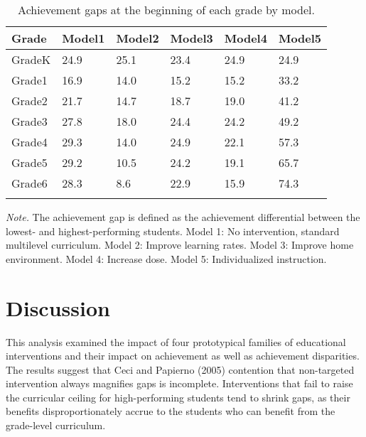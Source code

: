 \documentclass[english,floatsintext,jou]{apa6}
\theoremstyle{definition}
\theoremstyle{definition}
\theoremstyle{definition}
\theoremstyle{remark}
\begin{document}
\begin{table}[tbp]
\begin{center}
\begin{threeparttable}
\caption{\label{tab:ach-gaps}Achievement gaps at the beginning of each grade by model.}
\small{
\begin{tabular}{llllll}
\toprule
Grade & \multicolumn{1}{c}{Model1} & \multicolumn{1}{c}{Model2} & \multicolumn{1}{c}{Model3} & \multicolumn{1}{c}{Model4} & \multicolumn{1}{c}{Model5}\\
\midrule
GradeK & 24.9 & 25.1 & 23.4 & 24.9 & 24.9\\
Grade1 & 16.9 & 14.0 & 15.2 & 15.2 & 33.2\\
Grade2 & 21.7 & 14.7 & 18.7 & 19.0 & 41.2\\
Grade3 & 27.8 & 18.0 & 24.4 & 24.2 & 49.2\\
Grade4 & 29.3 & 14.0 & 24.9 & 22.1 & 57.3\\
Grade5 & 29.2 & 10.5 & 24.2 & 19.1 & 65.7\\
Grade6 & 28.3 & 8.6 & 22.9 & 15.9 & 74.3\\
\bottomrule
\addlinespace
\end{tabular}
}
\begin{tablenotes}[para]
\textit{Note.} The achievement gap is defined as the achievement differential between the lowest- and highest-performing students. Model 1: No intervention, standard multilevel curriculum. Model 2: Improve learning rates. Model 3: Improve home environment. Model 4: Increase dose. Model 5: Individualized instruction.
\end{tablenotes}
\end{threeparttable}
\end{center}
\end{table}

\section{Discussion}\label{discussion}

This analysis examined the impact of four prototypical families of
educational interventions and their impact on achievement as well as
achievement disparities. The results suggest that Ceci and Papierno
(2005) contention that non-targeted intervention always magnifies gaps
is incomplete. Interventions that fail to raise the curricular ceiling
for high-performing students tend to shrink gaps, as their benefits
disproportionately accrue to the students who can benefit from the
grade-level curriculum.
\end{document}
